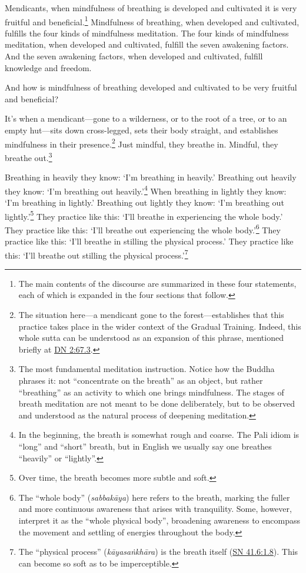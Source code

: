 \documentclass[12pt,openany]{book}%
\begin{document}
Mendicants, when mindfulness of breathing is developed and cultivated it is very fruitful and beneficial.\footnote{The main contents of the discourse are summarized in these four statements, each of which is expanded in the four sections that follow. } Mindfulness of breathing, when developed and cultivated, fulfills the four kinds of mindfulness meditation. The four kinds of mindfulness meditation, when developed and cultivated, fulfill the seven awakening factors. And the seven awakening factors, when developed and cultivated, fulfill knowledge and freedom. 

And how is mindfulness of breathing developed and cultivated to be very fruitful and beneficial? 

It’s when a mendicant—gone to a wilderness, or to the root of a tree, or to an empty hut—sits down cross-legged, sets their body straight, and establishes mindfulness in their presence.\footnote{The situation here—a mendicant gone to the forest—establishes that this practice takes place in the wider context of the Gradual Training. Indeed, this whole sutta can be understood as an expansion of this phrase, mentioned briefly at \href{https://suttacentral.net/dn2/en/sujato\#67.3}{DN 2:67.3}. } Just mindful, they breathe in. Mindful, they breathe out.\footnote{The most fundamental meditation instruction. Notice how the Buddha phrases it: not “concentrate on the breath” as an object, but rather “breathing” as an activity to which one brings mindfulness. The stages of breath meditation are not meant to be done deliberately, but to be observed and understood as the natural process of deepening meditation. } 

Breathing in heavily they know: ‘I’m breathing in heavily.’ Breathing out heavily they know: ‘I’m breathing out heavily.’\footnote{In the beginning, the breath is somewhat rough and coarse. The Pali idiom is “long” and “short” breath, but in English we usually say one breathes “heavily” or “lightly”. } When breathing in lightly they know: ‘I’m breathing in lightly.’ Breathing out lightly they know: ‘I’m breathing out lightly.’\footnote{Over time, the breath becomes more subtle and soft. } They practice like this: ‘I’ll breathe in experiencing the whole body.’ They practice like this: ‘I’ll breathe out experiencing the whole body.’\footnote{The “whole body” (\textit{\textsanskrit{sabbakāya}}) here refers to the breath, marking the fuller and more continuous awareness that arises with tranquility. Some, however, interpret it as the “whole physical body”, broadening awareness to encompass the movement and settling of energies throughout the body. } They practice like this: ‘I’ll breathe in stilling the physical process.’ They practice like this: ‘I’ll breathe out stilling the physical process.’\footnote{The “physical process” (\textit{\textsanskrit{kāyasaṅkhāra}}) is the breath itself (\href{https://suttacentral.net/sn41.6/en/sujato\#1.8}{SN 41.6:1.8}). This can become so soft as to be imperceptible. } 
\end{document}
